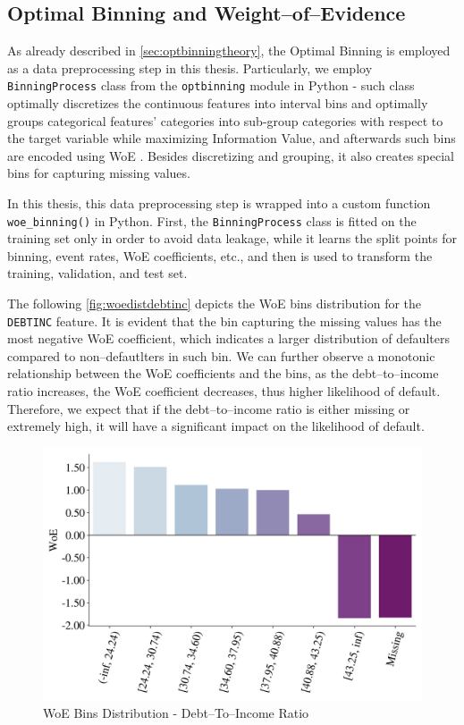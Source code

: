 \subsection{Optimal Binning and Weight--of--Evidence}
\label{subsec:prep-optbinning}
As already described in \autoref{sec:optbinningtheory}, the Optimal Binning is employed as a data preprocessing step in this thesis.
Particularly, we employ \lstinline{BinningProcess} class from the \lstinline{optbinning} module in Python - such class optimally discretizes the continuous features into interval bins and optimally groups categorical features' categories into sub-group categories with respect to the target variable while maximizing Information Value, and afterwards such bins are encoded using WoE \citep{navas2020optimal}. Besides discretizing and grouping, it also creates special bins for capturing missing values.


In this thesis, this data preprocessing step is wrapped into a custom function \lstinline{woe_binning()} in Python.
First, the \lstinline{BinningProcess} class is fitted on the training set only in order to avoid data leakage, while it learns the split points for binning, event rates, WoE coefficients, etc., and then is used to transform the training, validation, and test set.


The following \autoref{fig:woedistdebtinc} depicts the WoE bins distribution for the \texttt{DEBTINC} feature.
It is evident that the bin capturing the missing values has the most negative WoE coefficient, which indicates a larger distribution of defaulters compared to non--defautlters in such bin. We can further observe a monotonic relationship between the WoE coefficients and the bins, as the debt--to--income ratio increases, the WoE coefficient decreases, thus higher likelihood of default.
Therefore, we expect that if the debt--to--income ratio is either missing or extremely high, it will have a significant impact on the likelihood of default.
\begin{figure}[H]
    \centering
    \caption{WoE Bins Distribution - Debt--To--Income Ratio}\vspace{0.5em}
    \label{fig:woedistdebtinc}
    \includegraphics[width=120mm]{Figures/WoE_Distribution_DEBTINC.jpg}
    
    \vspace{-1em}
\end{figure}

